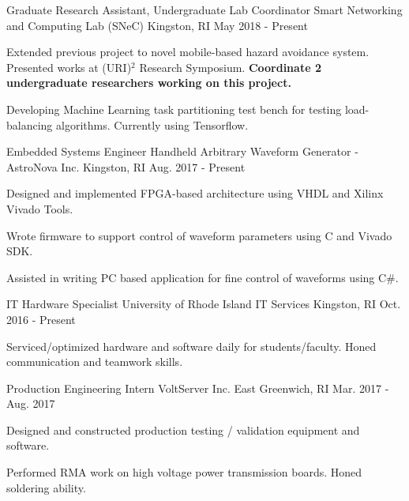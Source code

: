 \begin{cventries}
  \cventry
    {Graduate Research Assistant, Undergraduate Lab Coordinator}
    {Smart Networking and Computing Lab (SNeC)}
    {Kingston, RI}
    {May 2018 - Present}
    {
      \begin{cvitems}
        \item {Extended previous project to novel mobile-based hazard avoidance system. Presented works at (URI)$^2$ Research Symposium. \newline\textbf{Coordinate 2 undergraduate researchers working on this project.}}
        \item{Developing Machine Learning task partitioning test bench for testing load-balancing algorithms. Currently using Tensorflow.}
      \end{cvitems}
    }
    
  \cventry
    {Embedded Systems Engineer}
    {Handheld Arbitrary Waveform Generator - AstroNova Inc.}
    {Kingston, RI}
    {Aug. 2017 - Present}
    {
      \begin{cvitems}
        \item {Designed and implemented FPGA-based architecture using VHDL and Xilinx Vivado Tools.}
        \item {Wrote firmware to support control of waveform parameters using C and Vivado SDK.}
        \item {Assisted in writing PC based application for fine control of waveforms using C\#.}
      \end{cvitems}
    }
\cventry
    {IT Hardware Specialist}
    {University of Rhode Island IT Services}
    {Kingston, RI}
    {Oct. 2016 - Present}
    {
      \begin{cvitems}
        \item {Serviced/optimized hardware and software daily for students/faculty. Honed communication and teamwork skills.}
      \end{cvitems}
    }
  \cventry
    {Production Engineering Intern}
    {VoltServer Inc.}
    {East Greenwich, RI}
    {Mar. 2017 - Aug. 2017}
    {
      \begin{cvitems}
        \item {Designed and constructed production testing / validation equipment and software.}
        \item {Performed RMA work on high voltage power transmission boards. Honed soldering ability.}
      \end{cvitems}
    }
 \end{cventries}